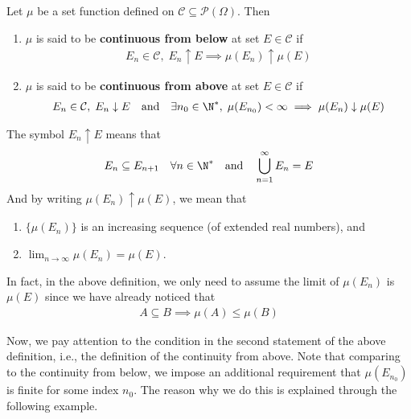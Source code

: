 \documentclass[thmcnt=section, 12pt, color=purple]{my-elegantbook}
\begin{document}

\begin{definition} \label{def:7}
	Let $\mu$ be a set function
	defined on $\mathcal{C} \subseteq \mathcal{P}(\Omega)$.
	Then
	\begin{enumerate}
		\item $\mu$ is said to 
			be \textbf{continuous from below}
			at set $E \in \mathcal{C}$ if
			\begin{align*}
				E_n \in \mathcal{C}, \; E_n \uparrow E
				\implies
				\mu(E_n) \uparrow \mu(E)
			\end{align*}
		\item $\mu$ is said to 
			be \textbf{continuous from above}
			at set $E \in \mathcal{C}$ if
			\begin{align*}
				E_n \in \mathcal{C}, \; E_n \downarrow E
				\quad \text{and} \quad
				\exists n_0 \in \N^\ast, \;
				\mu(E_{n_{0}}) < \infty
				\implies
				\mu(E_n) \downarrow \mu(E)
			\end{align*}
	\end{enumerate}
\end{definition}

The symbol $E_n \uparrow E$ means that
\begin{align*}
	E_n \subseteq E_{n+1} 
	\quad \forall n \in \N^\ast
	\quad \text{and} \quad
	\bigcup_{n = 1}^\infty E_n = E
\end{align*}
And by writing $\mu(E_n) \uparrow \mu(E)$,
we mean that 
\begin{enumerate}
	\item $\{\mu(E_n)\}$ is an increasing sequence 
		(of extended real numbers), and 
	\item $\lim_{n \to \infty} \mu(E_n) = \mu(E)$.
\end{enumerate}
In fact, in the above definition, we only need to assume 
the limit of $\mu(E_n)$ is $\mu(E)$
since we have already noticed that 
\begin{align*}
	A \subseteq B  \implies \mu(A) \leq \mu(B)
\end{align*}

Now, we pay attention to the condition in the second statement
of the above definition, i.e., 
the definition of the continuity from above.
Note that comparing to the continuity from below, 
we impose an additional requirement that $\mu(E_{n_0})$ is finite
for some index $n_0$.
The reason why we do this is explained through the following example.
\end{document}
